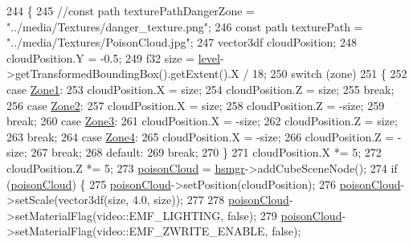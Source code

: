 \begin{DoxyCode}
244 \{
245     \textcolor{comment}{//const path texturePathDangerZone = "../media/Textures/danger\_texture.png";}
246     \textcolor{keyword}{const} path texturePath = \textcolor{stringliteral}{"../media/Textures/PoisonCloud.jpg"};
247     vector3df cloudPosition;
248     cloudPosition.Y = -0.5;
249     f32 size = \hyperlink{class_heat_map_manager_a63ca12aefa554bf0756608865f1e1909}{level}->getTransformedBoundingBox().getExtent().X / 18;
250     \textcolor{keywordflow}{switch} (zone)
251     \{
252     \textcolor{keywordflow}{case} \hyperlink{class_heat_map_manager_a6d43bc39106e6d2e72437f8902a586b6ac12fb3749b1e4eb1e472927e11bfd45b}{Zone1}:
253         cloudPosition.X = size;
254         cloudPosition.Z = size;
255         \textcolor{keywordflow}{break};
256     \textcolor{keywordflow}{case} \hyperlink{class_heat_map_manager_a6d43bc39106e6d2e72437f8902a586b6a3e20dce2afa7429facffa3cc1b41fcc3}{Zone2}:
257         cloudPosition.X = size;
258         cloudPosition.Z = -size;
259         \textcolor{keywordflow}{break};
260     \textcolor{keywordflow}{case} \hyperlink{class_heat_map_manager_a6d43bc39106e6d2e72437f8902a586b6a400a98ad8579431fad61d4325b5c9694}{Zone3}:
261         cloudPosition.X = -size;
262         cloudPosition.Z = size;
263         \textcolor{keywordflow}{break};
264     \textcolor{keywordflow}{case} \hyperlink{class_heat_map_manager_a6d43bc39106e6d2e72437f8902a586b6a39c3884e0f29b1453a01317ffc283a85}{Zone4}:
265         cloudPosition.X = -size;
266         cloudPosition.Z = -size;
267         \textcolor{keywordflow}{break};
268     \textcolor{keywordflow}{default}:
269         \textcolor{keywordflow}{break};
270     \}
271     cloudPosition.X *= 5;
272     cloudPosition.Z *= 5;
273     \hyperlink{class_heat_map_manager_a506da7726ec2f7d989ad407edd7b365d}{poisonCloud} = \hyperlink{_heat_map_manager_8cpp_afce8176d06e37bb8d8bf11f5947b4181}{hsmgr}->addCubeSceneNode();
274     \textcolor{keywordflow}{if} (\hyperlink{class_heat_map_manager_a506da7726ec2f7d989ad407edd7b365d}{poisonCloud}) \{
275         \hyperlink{class_heat_map_manager_a506da7726ec2f7d989ad407edd7b365d}{poisonCloud}->setPosition(cloudPosition);
276         \hyperlink{class_heat_map_manager_a506da7726ec2f7d989ad407edd7b365d}{poisonCloud}->setScale(vector3df(size, 4.0, size));
277 
278         \hyperlink{class_heat_map_manager_a506da7726ec2f7d989ad407edd7b365d}{poisonCloud}->setMaterialFlag(video::EMF\_LIGHTING, \textcolor{keyword}{false});
279         \hyperlink{class_heat_map_manager_a506da7726ec2f7d989ad407edd7b365d}{poisonCloud}->setMaterialFlag(video::EMF\_ZWRITE\_ENABLE, \textcolor{keyword}{false});

\end{DoxyCode}
